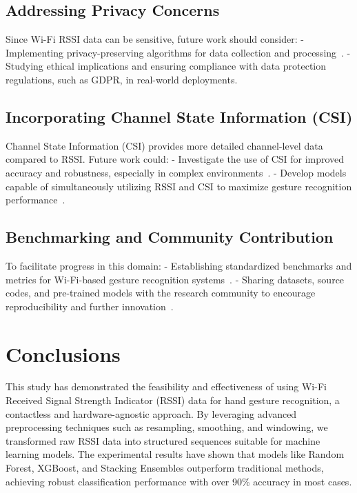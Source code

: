 \documentclass[10pt,twocolumn,letterpaper]{article}
\begin{document}
\subsection{Addressing Privacy Concerns}

Since Wi-Fi RSSI data can be sensitive, future work should consider:
- Implementing privacy-preserving algorithms for data collection and processing~\cite{dwork2014algorithmic}.
- Studying ethical implications and ensuring compliance with data protection regulations, such as GDPR, in real-world deployments.

\subsection{Incorporating Channel State Information (CSI)}

Channel State Information (CSI) provides more detailed channel-level data compared to RSSI. Future work could:
- Investigate the use of CSI for improved accuracy and robustness, especially in complex environments~\cite{wang2017wifi}.
- Develop models capable of simultaneously utilizing RSSI and CSI to maximize gesture recognition performance~\cite{haseeb2020wisture}.

\subsection{Benchmarking and Community Contribution}

To facilitate progress in this domain:
- Establishing standardized benchmarks and metrics for Wi-Fi-based gesture recognition systems~\cite{abdelnasser2015wifi}.
- Sharing datasets, source codes, and pre-trained models with the research community to encourage reproducibility and further innovation~\cite{haseeb2020wisture}.

\section{Conclusions}

This study has demonstrated the feasibility and effectiveness of using Wi-Fi Received Signal Strength Indicator (RSSI) data for hand gesture recognition, a contactless and hardware-agnostic approach. By leveraging advanced preprocessing techniques such as resampling, smoothing, and windowing, we transformed raw RSSI data into structured sequences suitable for machine learning models. The experimental results have shown that models like Random Forest, XGBoost, and Stacking Ensembles outperform traditional methods, achieving robust classification performance with over 90\% accuracy in most cases.
\end{document}
